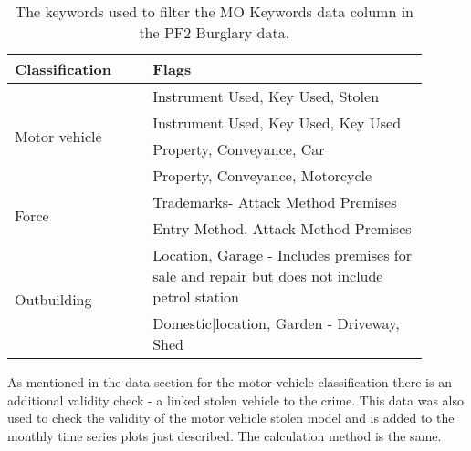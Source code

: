 \begin{table}[]
\centering
\begin{tabular}{p{0.3\linewidth}|p{0.6\linewidth}}
\toprule
Classification                    & Flags                                                                                     \\ \midrule
\multirow{4}{*}{Motor vehicle}    & Instrument Used, Key Used, Stolen                                                            \\
                                  & Instrument Used, Key Used, Key Used                                                          \\
                                  & Property, Conveyance, Car                                                                    \\
                                  & Property, Conveyance, Motorcycle                                                             \\ \midrule
\multirow{2}{*}{Force}       & Trademarks- Attack Method Premises                                                           \\
                                  & Entry Method, Attack Method Premises                                                         \\ \midrule
\multirow{2}{*}{Outbuilding} & Location, Garage - Includes premises for sale and repair but does not include petrol station \\
                                  & Domestic|location, Garden - Driveway, Shed                                                   \\ \bottomrule
\end{tabular}
\caption[Burglary Keywords]{\label{tab:burg_keywords}The keywords used to filter the MO Keywords data column in the PF2 Burglary data. }
\end{table}


As mentioned in the data section for the motor vehicle classification there is an additional validity check - a linked stolen vehicle to the crime. This data was also used to check the validity of the motor vehicle stolen model and is added to the monthly time series plots just described. The calculation method is the same.   

